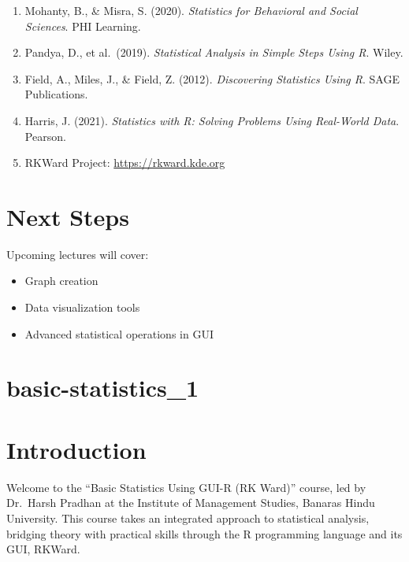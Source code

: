 \documentclass[
  letterpaper,
  DIV=11,
  numbers=noendperiod]{scrreprt}
\providecommand{\tightlist}{%
  \setlength{\itemsep}{0pt}\setlength{\parskip}{0pt}}
\begin{document}
\begin{enumerate}
\def\labelenumi{\arabic{enumi}.}
\tightlist
\item
  Mohanty, B., \& Misra, S. (2020). \emph{Statistics for Behavioral and
  Social Sciences}. PHI Learning.\\
\item
  Pandya, D., et al.~(2019). \emph{Statistical Analysis in Simple Steps
  Using R}. Wiley.\\
\item
  Field, A., Miles, J., \& Field, Z. (2012). \emph{Discovering
  Statistics Using R}. SAGE Publications.\\
\item
  Harris, J. (2021). \emph{Statistics with R: Solving Problems Using
  Real-World Data}. Pearson.\\
\item
  RKWard Project: \url{https://rkward.kde.org}
\end{enumerate}


\chapter{Next Steps}\label{next-steps}

Upcoming lectures will cover:

\begin{itemize}
\tightlist
\item
  Graph creation\\
\item
  Data visualization tools\\
\item
  Advanced statistical operations in GUI
\end{itemize}


\chapter{basic-statistics\_1}\label{basic-statistics_1}


\chapter{Introduction}\label{introduction-2}

Welcome to the ``Basic Statistics Using GUI-R (RK Ward)'' course, led by
Dr.~Harsh Pradhan at the Institute of Management Studies, Banaras Hindu
University. This course takes an integrated approach to statistical
analysis, bridging theory with practical skills through the R
programming language and its GUI, RKWard.
\end{document}
